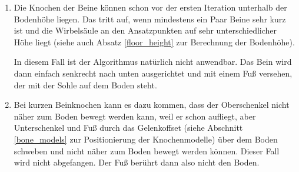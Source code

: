 \begin{enumerate}
 \item %
   Die Knochen der Beine können schon vor der ersten Iteration unterhalb der Bodenhöhe liegen. Das tritt auf, wenn mindestens ein Paar Beine sehr kurz ist und die Wirbelsäule an den Ansatzpunkten auf sehr unterschiedlicher Höhe liegt (siehe auch Absatz \ref{floor_height} zur Berechnung der Bodenhöhe).
   
   In diesem Fall ist der Algorithmus natürlich nicht anwendbar. Das Bein wird dann einfach senkrecht nach unten ausgerichtet und mit einem Fuß versehen, der mit der Sohle auf dem Boden steht.
   
 \item %
   Bei kurzen Beinknochen kann es dazu kommen, dass der Oberschenkel nicht näher zum Boden bewegt werden kann, weil er schon aufliegt, aber Unterschenkel und Fuß durch das Gelenkoffset (siehe Abschnitt \ref{bone_models} zur Positionierung der Knochenmodelle) über dem Boden schweben und nicht näher zum Boden bewegt werden können. Dieser Fall wird nicht abgefangen. Der Fuß berührt dann also nicht den Boden.
\end{enumerate}








